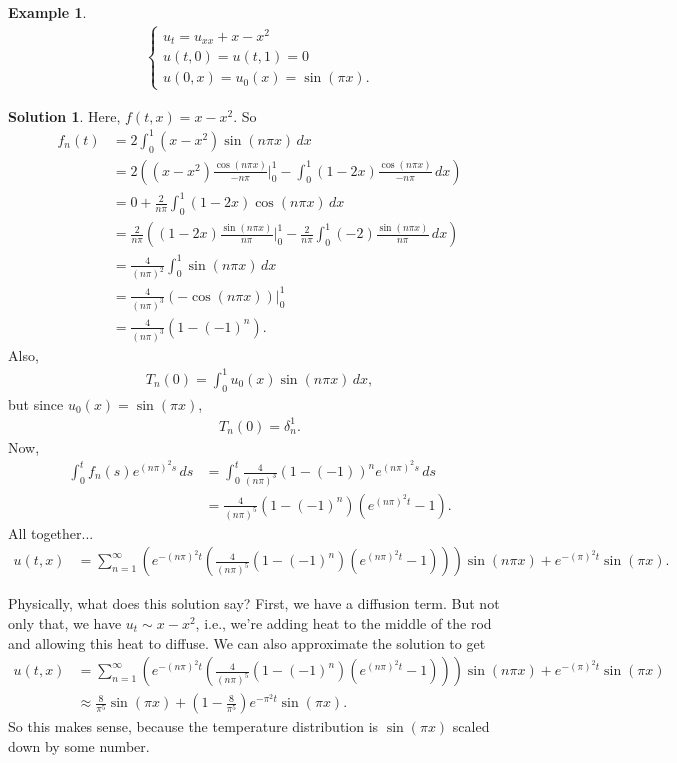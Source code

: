 \documentclass{book}
\theoremstyle{definition}
\newtheorem{exmp}{Example}[section]
\newtheorem*{sln*}{Solution}
\begin{document}
\begin{exmp}
	\begin{align*}
	\begin{cases}
	u_t = u_{xx} + x - x^2\\
	u(t,0) = u(t,1) = 0\\
	u(0,x) = u_0(x) = \sin(\pi x).
	\end{cases}
	\end{align*}
	\begin{sln*}
		Here, $f(t,x) = x - x^2$. So
		\begin{align*}
		f_n(t) &= 2\int^1_0 (x-x^2)\sin(n\pi x)\,dx\\
		&= 2\left( (x-x^2)\frac{\cos(n\pi x)}{-n\pi}\bigg\vert^1_0 - \int^1_0(1-2x)\frac{\cos(n\pi x)}{-n\pi}\,dx \right)\\
		&= 0 + \frac{2}{n\pi}\int^1_0 (1-2x)\cos(n\pi x)\,dx\\
		&= \frac{2}{n\pi}\left( (1-2x)\frac{\sin(n\pi x)}{n\pi}\bigg\vert^1_0 - \frac{2}{n\pi}\int^1_0(-2)\frac{\sin(n\pi x)}{n\pi}\,dx \right)\\
		&= \frac{4}{(n\pi)^2}\int^1_0 \sin(n\pi x)\,dx\\
		&= \frac{4}{(n\pi)^3}(-\cos(n\pi x))\bigg\vert^1_0\\
		&= \frac{4}{(n\pi)^3}(1-(-1)^n).
		\end{align*}
		Also,
		\begin{align*}
		T_n(0) = \int^1_0u_0(x)\sin(n\pi x)\,dx,
		\end{align*}
		but since $u_0(x) = \sin(\pi x)$,
		\begin{align*}
		T_n(0) = \delta^1_n.
		\end{align*}
		Now,
		\begin{align*}
		\int_0^t f_n(s) e^{( n \pi)^2s} \,ds &= \int_0^t \frac{4}{(n\pi)^3}(1-(-1))^n e^{( n \pi)^2s} \,ds\\
		&= \frac{4}{(n\pi)^5}(1-(-1)^n)\left(e^{(n\pi)^2t} - 1\right).
		\end{align*}
		All together...
		\begin{align*}
		u(t,x) &= \sum^\infty_{n=1} \left(e^{-( n\pi)^2t}\left(\frac{4}{(n\pi)^5}(1-(-1)^n)\left(e^{(n\pi)^2t} - 1\right) \right)\right)\sin(n\pi x) + e^{-(\pi )^2t}\sin(\pi x).
		\end{align*}
	\end{sln*}
\end{exmp}

Physically, what does this solution say? First, we have a diffusion term. But not only that, we have $u_t \sim x-x^2$, i.e., we're adding heat to the middle of the rod and allowing this heat to diffuse. We can also approximate the solution to get
\begin{align*}
u(t,x) &= \sum^\infty_{n=1} \left(e^{-( n\pi)^2t}\left(\frac{4}{(n\pi)^5}(1-(-1)^n)\left(e^{(n\pi)^2t} - 1\right) \right)\right)\sin(n\pi x) + e^{-(\pi )^2t}\sin(\pi x)\\
&\approx \frac{8}{\pi^5}\sin(\pi x) + \left(1 - \frac{8}{\pi^5}\right)e^{-\pi^2 t}\sin(\pi x).
\end{align*}
So this makes sense, because the temperature distribution is $\sin(\pi x)$ scaled down by some number. 
\end{document}
